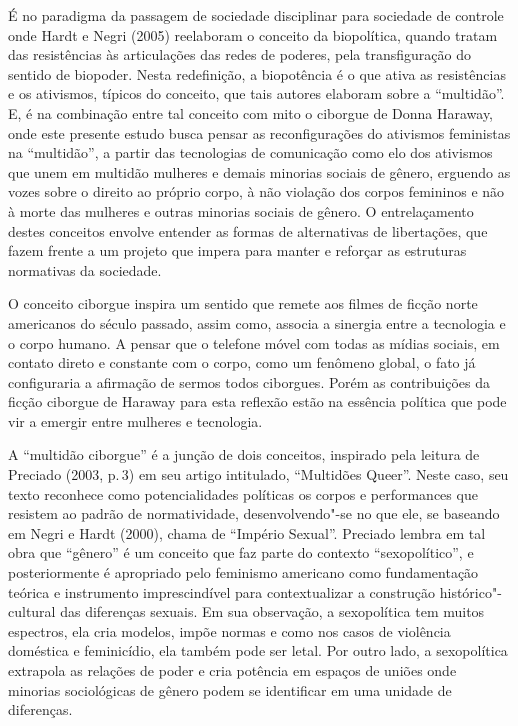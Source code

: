 É no paradigma da passagem de sociedade disciplinar para sociedade de
controle onde Hardt e Negri (2005) reelaboram o conceito da biopolítica,
quando tratam das resistências às articulações das redes de poderes,
pela transfiguração do sentido de biopoder. Nesta redefinição, a
biopotência é o que ativa as resistências e os ativismos, típicos do
conceito, que tais autores elaboram sobre a ``multidão''. E, é na
combinação entre tal conceito com mito o ciborgue de Donna Haraway, onde
este presente estudo busca pensar as reconfigurações do ativismos
feministas na ``multidão'', a partir das tecnologias de comunicação como
elo dos ativismos que unem em multidão mulheres e demais minorias
sociais de gênero, erguendo as vozes sobre o direito ao próprio corpo, à
não violação dos corpos femininos e não à morte das mulheres e outras
minorias sociais de gênero. O entrelaçamento destes conceitos envolve
entender as formas de alternativas de libertações, que fazem frente a um
projeto que impera para manter e reforçar as estruturas normativas da
sociedade.

O conceito ciborgue inspira um sentido que remete aos filmes de ficção
norte americanos do século passado, assim como, associa a sinergia entre
a tecnologia e o corpo humano. A pensar que o telefone móvel com todas
as mídias sociais, em contato direto e constante com o corpo, como um
fenômeno global, o fato já configuraria a afirmação de sermos todos
ciborgues. Porém as contribuições da ficção ciborgue de Haraway para
esta reflexão estão na essência política que pode vir a emergir entre
mulheres e tecnologia.

A ``multidão ciborgue'' é a junção de dois conceitos, inspirado pela
leitura de Preciado (2003, p.\,3) em seu artigo intitulado, ``Multidões
Queer''. Neste caso, seu texto reconhece como potencialidades políticas
os corpos e performances que resistem ao padrão de normatividade,
desenvolvendo"-se no que ele, se baseando em Negri e Hardt (2000), chama
de ``Império Sexual''. Preciado lembra em tal obra que ``gênero'' é um
conceito que faz parte do contexto ``sexopolítico'', e posteriormente é
apropriado pelo feminismo americano como fundamentação teórica e
instrumento imprescindível para contextualizar a construção
histórico"-cultural das diferenças sexuais. Em sua observação, a
sexopolítica tem muitos espectros, ela cria modelos, impõe normas e como
nos casos de violência doméstica e feminicídio, ela também pode ser
letal. Por outro lado, a sexopolítica extrapola as relações de poder e
cria potência em espaços de uniões onde minorias sociológicas de gênero
podem se identificar em uma unidade de diferenças.

